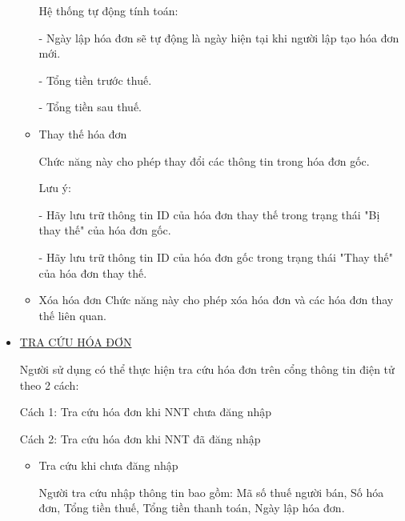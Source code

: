\begin{itemize}
\begin{itemize}
Hệ thống tự động tính toán:

- Ngày lập hóa đơn sẽ tự động là ngày hiện tại khi người lập tạo hóa đơn mới.

- Tổng tiền trước thuế.

- Tổng tiền sau thuế.

\item Thay thế hóa đơn


Chức năng này cho phép thay đổi các thông tin trong hóa đơn gốc.

Lưu ý:

- Hãy lưu trữ thông tin ID của hóa đơn thay thế trong trạng thái "Bị thay thế" của hóa đơn gốc.

- Hãy lưu trữ thông tin ID của hóa đơn gốc trong trạng thái "Thay thế" của hóa đơn thay thế.
\item  Xóa hóa đơn
Chức năng này cho phép xóa hóa đơn và các hóa đơn thay thế liên quan.



\end{itemize}

\item \underline{\textsc{TRA CỨU HÓA ĐƠN}}


Người sử dụng có thể thực hiện tra cứu hóa đơn trên cổng thông tin điện tử theo 2 cách:

Cách 1: Tra cứu hóa đơn khi NNT chưa đăng nhập

Cách 2: Tra cứu hóa đơn khi NNT đã đăng nhập
\begin{itemize}

\item Tra cứu khi chưa đăng nhập


Người tra cứu nhập thông tin bao gồm: Mã số thuế người bán, Số hóa đơn, Tổng tiền thuế, Tổng tiền thanh toán, Ngày lập hóa đơn.







\end{itemize}
\end{itemize}
